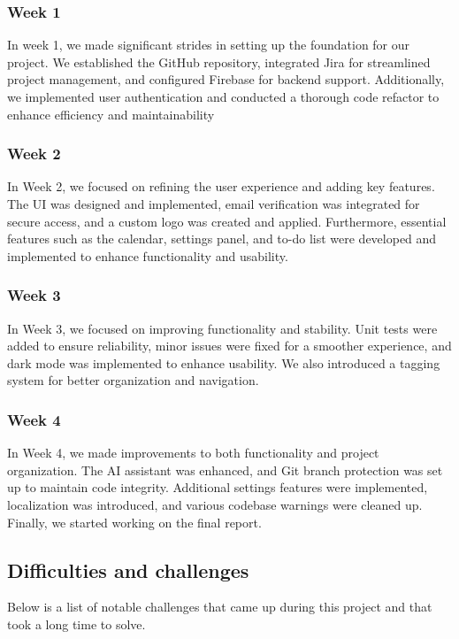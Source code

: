 \documentclass{article}
\begin{document}
\subsubsection{Week 1}
In week 1, we made significant strides in setting up the foundation for our project.
We established the GitHub repository, integrated Jira for streamlined project management, and configured Firebase for backend support.
Additionally, we implemented user authentication and conducted a thorough code refactor to enhance efficiency and maintainability

\subsubsection{Week 2}
In Week 2, we focused on refining the user experience and adding key features.
The UI was designed and implemented, email verification was integrated for secure access, and a custom logo was created and applied.
Furthermore, essential features such as the calendar, settings panel, and to-do list were developed and implemented to enhance functionality and usability.

\subsubsection{Week 3}
In Week 3, we focused on improving functionality and stability.
Unit tests were added to ensure reliability, minor issues were fixed for a smoother experience, and dark mode was implemented to enhance usability.
We also introduced a tagging system for better organization and navigation.

\subsubsection{Week 4}
In Week 4, we made improvements to both functionality and project organization.
The AI assistant was enhanced, and Git branch protection was set up to maintain code integrity.
Additional settings features were implemented, localization was introduced, and various codebase warnings were cleaned up.
Finally, we started working on the final report.

\subsection{Difficulties and challenges}
Below is a list of notable challenges that came up during this project and that took a long time to solve.
\end{document}
